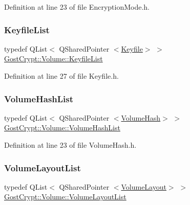 Definition at line 23 of file Encryption\+Mode.\+h.

\mbox{\label{namespace_gost_crypt_1_1_volume_af2dce083ae31a8d22257d609e924963d}} 
\subsubsection{\texorpdfstring{Keyfile\+List}{KeyfileList}}
{\footnotesize\ttfamily typedef Q\+List$<$ Q\+Shared\+Pointer $<$\hyperlink{class_gost_crypt_1_1_volume_1_1_keyfile}{Keyfile}$>$ $>$ \hyperlink{namespace_gost_crypt_1_1_volume_af2dce083ae31a8d22257d609e924963d}{Gost\+Crypt\+::\+Volume\+::\+Keyfile\+List}}



Definition at line 27 of file Keyfile.\+h.

\mbox{\label{namespace_gost_crypt_1_1_volume_a513257938e5ea0554ad83d0eb08f8f67}} 
\subsubsection{\texorpdfstring{Volume\+Hash\+List}{VolumeHashList}}
{\footnotesize\ttfamily typedef Q\+List$<$ Q\+Shared\+Pointer $<$\hyperlink{class_gost_crypt_1_1_volume_1_1_volume_hash}{Volume\+Hash}$>$ $>$ \hyperlink{namespace_gost_crypt_1_1_volume_a513257938e5ea0554ad83d0eb08f8f67}{Gost\+Crypt\+::\+Volume\+::\+Volume\+Hash\+List}}



Definition at line 23 of file Volume\+Hash.\+h.

\mbox{\label{namespace_gost_crypt_1_1_volume_a5b9119eca7c78317a24ab85145fb9ac8}} 
\subsubsection{\texorpdfstring{Volume\+Layout\+List}{VolumeLayoutList}}
{\footnotesize\ttfamily typedef Q\+List$<$ Q\+Shared\+Pointer $<$\hyperlink{class_gost_crypt_1_1_volume_1_1_volume_layout}{Volume\+Layout}$>$ $>$ \hyperlink{namespace_gost_crypt_1_1_volume_a5b9119eca7c78317a24ab85145fb9ac8}{Gost\+Crypt\+::\+Volume\+::\+Volume\+Layout\+List}}



